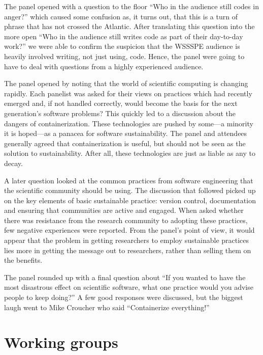 \documentclass[11pt, oneside]{amsart}
\begin{document}
The panel opened with a question to the floor ``Who in the audience still codes in anger?'' which caused some confusion as, it turns out, that this is a turn of phrase that has not crossed the Atlantic.
After translating this question into the more open ``Who in the audience still writes code as part of their day-to-day work?'' we were able to confirm the suspicion that the WSSSPE audience is heavily involved writing, not just using, code.
Hence, the panel were going to have to deal with questions from a highly experienced audience.

The panel opened by noting that the world of scientific computing is changing rapidly.
Each panelist was asked for their views on practices which had recently emerged and, if not handled correctly, would become the basis for the next generation's software problems?
This quickly led to a discussion about the dangers of containerization.
These technologies are pushed by some---a minority it is hoped---as a panacea for software sustainability.
The panel and attendees generally agreed that containerization is useful, but should not be seen as the solution to sustainability.
After all, these technologies are just as liable as any to decay.

A later question looked at the common practices from software engineering that the scientific community should be using.
The discussion that followed picked up on the key elements of basic sustainable practice: version control, documentation and ensuring that communities are active and engaged.
When asked whether there was resistance from the research community to adopting these practices, few negative experiences were reported.
From the panel's point of view, it would appear that the problem in getting researchers to employ sustainable practices lies more in getting the message out to researchers, rather than selling them on the benefits.

The panel rounded up with a final question about ``If you wanted to have the most disastrous effect on scientific software, what one practice would you advise people to keep doing?''
A few good responses were discussed, but the biggest laugh went to Mike Croucher who said ``Containerize everything!''


\section{Working groups} \label{sec:WGs}
\end{document}

